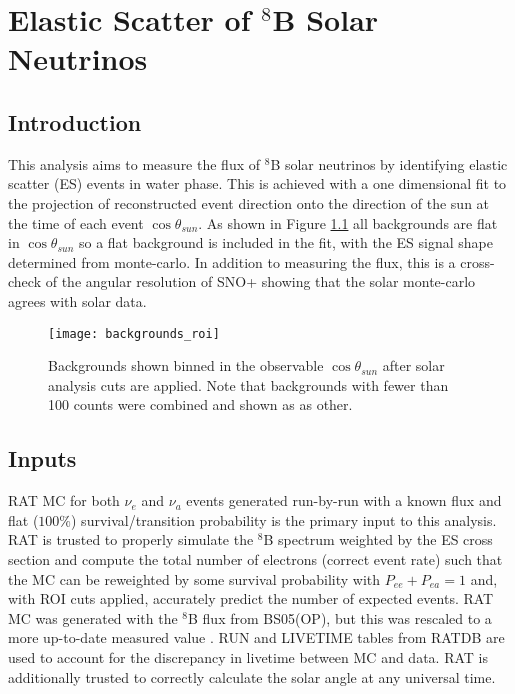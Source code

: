 \chapter{Elastic Scatter of $^8$B Solar Neutrinos}
\label{ch:es}

\section{Introduction}
\label{sec:solar:intro}

This analysis aims to measure the flux of $^8$B solar neutrinos by identifying
elastic scatter (ES) events in water phase.
This is achieved with a one dimensional fit to the projection of reconstructed
event direction onto the direction of the sun at the time of each event
$\cos{\theta_{sun}}$.
As shown in Figure \ref{fig:solar:backgrounds} all backgrounds are flat in
$\cos{\theta_{sun}}$ so a flat background is included in the fit, with the ES
signal shape determined from monte-carlo.
In addition to measuring the flux, this is a cross-check of the angular
resolution of SNO+ showing that the solar monte-carlo agrees with solar data.

\begin{figure}
\centering
\texttt{[image: backgrounds\_roi]}
\caption{Backgrounds shown binned in the observable $\cos{\theta_{sun}}$ after
         solar analysis cuts are applied. Note that backgrounds with fewer than
         100 counts were combined and shown as as other.}
\label{fig:solar:backgrounds}
\end{figure}

\section{Inputs}
\label{sec:solar:inputs}

RAT MC for both $\nu_e$ and $\nu_a$ events generated run-by-run with a known
flux and flat ($100\%$) survival/transition probability is the primary input to this
analysis.
RAT is trusted to properly simulate the $^8$B spectrum weighted by the ES cross
section and compute the total number of electrons (correct event rate) such
that the MC can be reweighted by some survival probability with
$P_{ee}+P_{ea}=1$ and, with ROI cuts applied, accurately predict the number of
expected events.
RAT MC was generated with the $^8$B flux from BS05(OP), but this was rescaled 
to a more up-to-date measured value  \cite{GlobalSolarFlux}.
RUN and LIVETIME tables from RATDB are used to account for the discrepancy in
livetime between MC and data.
RAT is additionally trusted to correctly calculate the solar angle at any
universal time.

